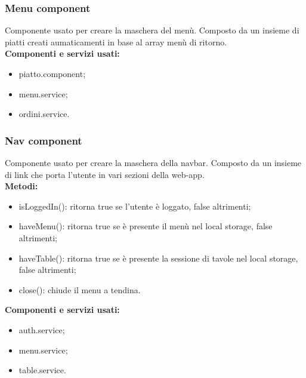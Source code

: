 \subsubsection{Menu component}
Componente usato per creare la maschera del menù. Composto da un insieme di piatti creati aumaticamenti in base al array menù di ritorno.\\
\textbf{Componenti e servizi usati:}
\begin{itemize}
    \item piatto.component;
    \item menu.service;
    \item ordini.service.
\end{itemize}

\subsubsection{Nav component}
Componente usato per creare la maschera della navbar. Composto da un insieme di link che porta l'utente in vari sezioni della web-app.\\
\textbf{Metodi:}
\begin{itemize}
    \item isLoggedIn(): ritorna true se l'utente è loggato, false altrimenti;
    \item haveMenu(): ritorna true se è presente il menù nel local storage, false altrimenti;
    \item haveTable(): ritorna true se è presente la sessione di tavole nel local storage, false altrimenti;
    \item close(): chiude il menu a tendina.
\end{itemize}
\textbf{Componenti e servizi usati:}
\begin{itemize}    
    \item auth.service;
    \item menu.service;
    \item table.service.
\end{itemize}

